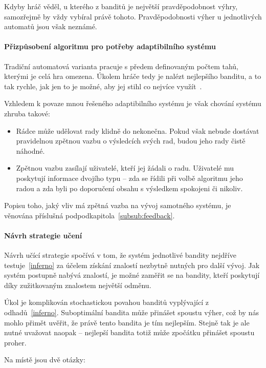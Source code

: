 \documentclass[thesis=M,czech]{FITthesis}[2014/05/07]
\begin{document}
Kdyby hráč věděl, u kterého z banditů je největší pravděpodobnost výhry, samozřejmě by vždy vybíral právě tohoto. Pravděpodobnosti výher u jednotlivých automatů jsou však neznámé.

\paragraph{Přizpůsobení algoritmu pro potřeby adaptibilního systému}
Tradiční automatová varianta pracuje s předem definovaným počtem tahů, kterými je celá hra omezena. Úkolem hráče tedy je nalézt nejlepšího banditu, a to tak rychle, jak jen to je možné, aby jej stihl co nejvíce využít~\cite{camdp}.

Vzhledem k povaze mnou řešeného adaptibilního systému je však chování systému zhruba takové:

\begin{itemize}
	\item Rádce může udělovat rady klidně do nekonečna. Pokud však nebude dostávat pravidelnou zpětnou vazbu o výsledcích svých rad, budou jeho rady čistě náhodné.
	\item Zpětnou vazbu zasílají uživatelé, kteří jej žádali o radu. Uživatelé mu poskytují informace dvojího typu – zda se řídili při volbě algoritmu jeho radou a zda byli po doporučení obsahu s výsledkem spokojeni či nikoliv.  
\end{itemize}

Popisu toho, jaký vliv má zpětná vazba na vývoj samotného systému, je věnována příslušná podpodkapitola~\ref{subsub:feedback}.

\paragraph{Návrh strategie učení}
	
Návrh učící strategie spočívá v tom, že systém jednotlivé bandity nejdříve testuje~\ref{inferno} za účelem získání znalostí nezbytně nutných pro další vývoj. Jak systém postupně nabývá znalostí, je možné zaměřit se na bandity, kteří poskytují díky zužitkovaným znalostem největší odměnu. 

Úkol je komplikován stochastickou povahou banditů vyplývající z odhadů~\ref{inferno}. Suboptimální bandita může přinášet spoustu výher, což by nás mohlo přimět uvěřit, že právě tento bandita je tím nejlepším. Stejně tak je ale nutné uvažovat naopak – nejlepší bandita totiž může zpočátku přinášet spoustu proher.

Na místě jsou dvě otázky:
\end{document}

